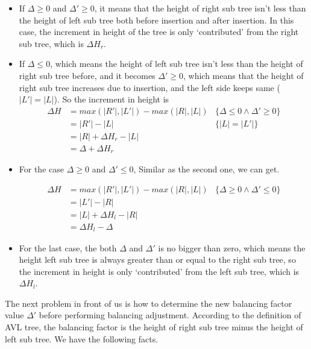 \documentclass{article}
\begin{document}
\begin{itemize}
\item If $\Delta \geq 0$ and $\Delta' \geq 0$, it means that the height
of right sub tree isn't less than the height of left sub tree both
before insertion and after insertion. In this case, the increment in
height of the tree is only `contributed' from the right sub tree, which
is $\Delta H_r$.

\item If $\Delta \leq 0$, which means the height of left sub tree isn't
less than the height of right sub tree before, and it becomes
$\Delta' \geq 0$,
which means that the height of right sub tree increases due to insertion,
and the left side keeps same ($|L'|=|L|$). So the increment in height is
\[
\begin{array}{rll}
\Delta H & = max(|R'|, |L'|) - max (|R|, |L|) & \{\Delta \leq 0 \land \Delta' \geq 0 \}\\
         & = |R'|-|L| & \{|L|=|L'| \}\\
         & = |R|+\Delta H_r - |L| & \\
         & = \Delta + \Delta H_r &
\end{array}
\]

\item For the case $\Delta \geq 0$ and $\Delta' \leq 0$, Similar as the
second one, we can get.

\[
\begin{array}{rll}
\Delta H & = max(|R'|, |L'|) - max (|R|, |L|) & \{\Delta \geq 0 \land \Delta' \leq 0 \}\\
         & = |L'|-|R| & \\
         & = |L|+\Delta H_l - |R| & \\
         & = \Delta H_l - \Delta&
\end{array}
\]

\item For the last case, the both $\Delta$ and $\Delta'$ is no bigger than
zero, which means the height left sub tree is always greater than or equal
 to the right sub tree, so the increment in height is only `contributed'
from the left sub tree, which is $\Delta H_l$.
\end{itemize}

The next problem in front of us is how to determine the new balancing
factor value $\Delta'$ before performing balancing adjustment.
According to the definition of AVL tree, the balancing factor is the
height of right sub tree minus the height of left sub tree. We have
the following facts.
\end{document}
